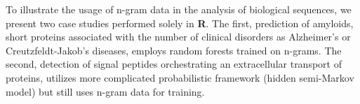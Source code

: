 \documentclass[\main/boa.tex]{subfiles}
\begin{document}
To illustrate the usage of n-gram data in the analysis of biological
sequences, we present two case studies performed solely in \textbf{R}.
The first, prediction of amyloids, short proteins associated with the
number of clinical disorders as Alzheimer's or Creutzfeldt-Jakob's
diseases, employs random forests trained on n-grams. The second,
detection of signal peptides orchestrating an extracellular transport of
proteins, utilizes more complicated probabilistic framework (hidden
semi-Markov model) but still uses n-gram data for training.
\end{document}
